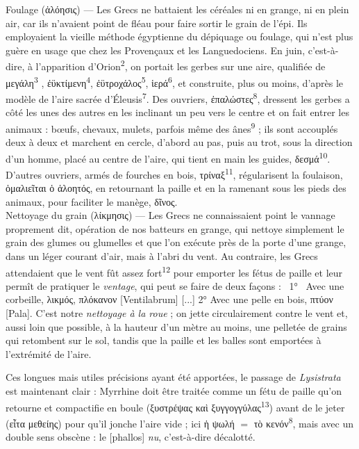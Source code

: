 \documentclass[12pt]{book}%
\newcommand{\italique}[1]{\textit{#1}}%
\newcommand{\citComm}[1]{\begin{quoting}[vskip=0pt] #1 \end{quoting}}%
\newcommand{\latin}[1]{{\policeLat #1}}%
\newcommand{\marqueur}[1]{\textsuperscript{#1}}%
\newenvironment{groupe}{%
\pstart%
\ledgroup%
}{%
\pend %
}%
\begin{document}
\begin{pages}
\begin{Leftside}
\begin{groupe}
{{\citComm{Foulage (ἀλόησις) --- Les Grecs ne battaient les céréales ni en grange, ni en plein air, car ils n'avaient point de fléau pour faire sortir le grain de l'épi. Ils employaient la vieille méthode égyptienne du dépiquage ou foulage, qui n'est plus guère en usage que chez les Provençaux et les Languedociens. En juin, c’est-à-dire, à l'apparition d’Orion\marqueur{2}, on portait les gerbes sur une aire, qualifiée de μεγάλη\marqueur{3} , ἐϋκτίμενη\marqueur{4}, ἐϋτροχάλος\marqueur{5}, ἱερά\marqueur{6}, et construite, plus ou moins, d'après le modèle de l'aire sacrée d'Éleusis\marqueur{7}. Des ouvriers, ἐπαλώστες\marqueur{8}, dressent les gerbes a côté les unes des autres en les inclinant un peu vers le centre et on fait entrer les animaux : bœufs, chevaux, mulets, parfois même des ânes\marqueur{9} ; ils sont accouplés deux à deux et marchent en cercle, d’abord au pas, puis au trot, sous la direction d'un homme, placé au centre de l'aire, qui tient en main les guides, δεσμά\marqueur{10}. D'autres ouvriers, armés de fourches en bois, τρίναξ\marqueur{11}, régularisent la foulaison, ὁμαλιεῖται ὁ ἁλοητός, en retournant la paille et en la ramenant sous les pieds des animaux, pour faciliter le manège, δῖνος.\\
Nettoyage du grain (λίκμησις)  — Les Grecs ne connaissaient point le vannage proprement dit, opération de nos batteurs en grange, qui nettoye simplement le grain des glumes ou glumelles et que l'on exécute près de la porte d’une grange, dans un léger courant d'air, mais à l'abri du vent. Au contraire, les Grecs attendaient que le vent fût assez fort\marqueur{12} pour emporter les fétus de paille et leur permît de pratiquer le \italique{ventage}, qui peut se faire de deux façons :  1°  Avec une corbeille, λικμός, πλόκανον [\latin{Ventilabrum}] [...]    2°   Avec une pelle en bois, πτύον [\latin{Pala}]. C'est notre \italique{nettoyage à la roue} ; on jette circulairement contre le vent et, aussi loin que possible, à la hauteur d’un mètre au moins, une pelletée de grains qui retombent sur le sol, tandis que la paille et les balles sont emportées à l'extrémité de l'aire.}%
Ces longues mais utiles précisions ayant été apportées, le passage de \italique{Lysistrata} est maintenant clair : Myrrhine doit être traitée comme un fétu de paille qu'on retourne et compactifie en boule (ξυστρέψας καὶ ξυγγογγύλας\marqueur{13}) avant de le jeter (εἶτα μεθείης) pour qu'il jonche l'aire vide ; ici ἡ ψωλή $=$ τὸ κενόν\marqueur{8}, mais avec un double sens obscène : le [phallos] \italique{nu}, c'est-à-dire décalotté.\\
}}
\end{groupe}
\end{Leftside}
\end{pages}
\end{document}
